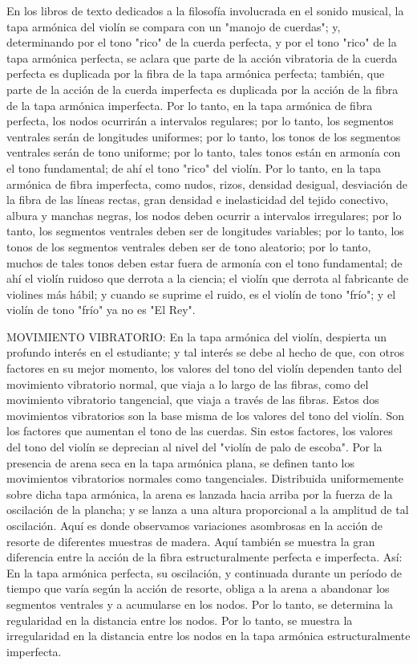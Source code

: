 \documentclass[12pt]{book}
\begin{document}
En los libros de texto dedicados a la filosofía involucrada en el sonido musical, la tapa armónica del violín se compara con un "manojo de cuerdas"; y, determinando por el tono "rico" de la cuerda perfecta, y por el tono "rico" de la tapa armónica perfecta, se aclara que parte de la acción vibratoria de la cuerda perfecta es duplicada por la fibra de la tapa armónica perfecta; también, que parte de la acción de la cuerda imperfecta es duplicada por la acción de la fibra de la tapa armónica imperfecta. Por lo tanto, en la tapa armónica de fibra perfecta, los nodos ocurrirán a intervalos regulares; por lo tanto, los segmentos ventrales serán de longitudes uniformes; por lo tanto, los tonos de los segmentos ventrales serán de tono uniforme; por lo tanto, tales tonos están en armonía con el tono fundamental; de ahí el tono "rico" del violín. Por lo tanto, en la tapa armónica de fibra imperfecta, como nudos, rizos, densidad desigual, desviación de la fibra de las líneas rectas, gran densidad e inelasticidad del tejido conectivo, albura y manchas negras, los nodos deben ocurrir a intervalos irregulares; por lo tanto, los segmentos ventrales deben ser de longitudes variables; por lo tanto, los tonos de los segmentos ventrales deben ser de tono aleatorio; por lo tanto, muchos de tales tonos deben estar fuera de armonía con el tono fundamental; de ahí el violín ruidoso que derrota a la ciencia; el violín que derrota al fabricante de violines más hábil; y cuando se suprime el ruido, es el violín de tono "frío"; y el violín de tono "frío" ya no es "El Rey".

MOVIMIENTO VIBRATORIO: En la tapa armónica del violín, despierta un profundo interés en el estudiante; y tal interés se debe al hecho de que, con otros factores en su mejor momento, los valores del tono del violín dependen tanto del movimiento vibratorio normal, que viaja a lo largo de las fibras, como del movimiento vibratorio tangencial, que viaja a través de las fibras. Estos dos movimientos vibratorios son la base misma de los valores del tono del violín. Son los factores que aumentan el tono de las cuerdas. Sin estos factores, los valores del tono del violín se deprecian al nivel del "violín de palo de escoba". Por la presencia de arena seca en la tapa armónica plana, se definen tanto los movimientos vibratorios normales como tangenciales. Distribuida uniformemente sobre dicha tapa armónica, la arena es lanzada hacia arriba por la fuerza de la oscilación de la plancha; y se lanza a una altura proporcional a la amplitud de tal oscilación. Aquí es donde observamos variaciones asombrosas en la acción de resorte de diferentes muestras de madera. Aquí también se muestra la gran diferencia entre la acción de la fibra estructuralmente perfecta e imperfecta. Así: En la tapa armónica perfecta, su oscilación, y continuada durante un período de tiempo que varía según la acción de resorte, obliga a la arena a abandonar los segmentos ventrales y a acumularse en los nodos. Por lo tanto, se determina la regularidad en la distancia entre los nodos. Por lo tanto, se muestra la irregularidad en la distancia entre los nodos en la tapa armónica estructuralmente imperfecta.
\end{document}
